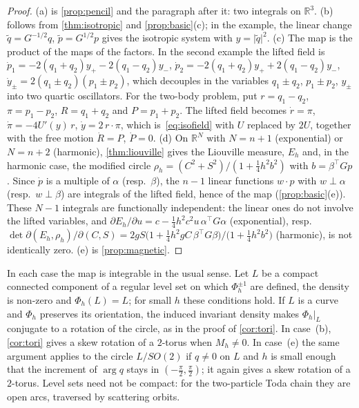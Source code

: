 \documentclass[11pt,a4paper]{article}
\theoremstyle{definition}
\theoremstyle{remark}
\newcommand{\R}{\mathbb{R}}
\newcommand{\tr}{^{\!\top}}
\begin{document}
\begin{proof}
(a) is \cref{prop:pencil} and the paragraph after it: two integrals on $\R^3$. (b) follows from
\cref{thm:isotropic} and \cref{prop:basic}(c); in the example, the linear change $\tilde q=G^{-1/2}q$,
$\tilde p=G^{1/2}p$ gives the isotropic system with $y=\lvert\tilde q\rvert^2$. (c) The map is the product of the
maps of the factors. In the second example the lifted
field is $\dot p_1=-2(q_1+q_2)y_+-2(q_1-q_2)y_-$, $\dot p_2=-2(q_1+q_2)y_++2(q_1-q_2)y_-$,
$\dot y_\pm=2(q_1\pm q_2)(p_1\pm p_2)$, which decouples in the variables $q_1\pm q_2$, $p_1\pm p_2$, $y_\pm$ into two
quartic oscillators. For the two-body problem, put $r=q_1-q_2$, $\pi=p_1-p_2$, $R=q_1+q_2$ and $P=p_1+p_2$. The
lifted field becomes $\dot r=\pi$, $\dot\pi=-4U'(y)\,r$, $\dot y=2\,r\cdot\pi$, which is~\eqref{eq:isofield} with
$U$ replaced by $2U$, together with the free motion $\dot R=P$, $\dot P=0$. (d) On $\R^N$ with $N=n+1$ (exponential) or $N=n+2$ (harmonic), \cref{thm:liouville} gives
the Liouville measure, $E_h$ and, in the harmonic case, the modified circle
$\rho_h=(C^2+S^2)/(1+\frac14h^2b^2)$ with $b=\beta\tr Gp$. Since $\dot p$ is a multiple of $\alpha$ (resp.\
$\beta$), the $n-1$ linear functions $w\cdot p$ with $w\perp\alpha$ (resp.\ $w\perp\beta$) are integrals of the
lifted field, hence of the map (\cref{prop:basic}(e)). These $N-1$ integrals are functionally independent: the
linear ones do not involve the lifted variables, and $\partial E_h/\partial u=c-\frac14h^2c^2u\,\alpha\tr G\alpha$
(exponential), resp.\ $\det\partial(E_h,\rho_h)/\partial(C,S)=2gS\big(1+\frac14h^2gC\,\beta\tr G\beta\big)/
\big(1+\frac14h^2b^2\big)$ (harmonic), is not identically zero. (e) is \cref{prop:magnetic}.
\end{proof}

In each case the map is integrable in the usual sense. Let $L$ be a compact connected component of a regular
level set on which $\Phi_h^{\pm1}$ are defined, the density is non-zero and $\Phi_h(L)=L$; for small $h$ these
conditions hold. If $L$ is a curve and $\Phi_h$ preserves its orientation, the induced invariant density makes
$\Phi_h|_L$ conjugate to a rotation of the circle, as in the proof of \cref{cor:tori}. In case~(b),
\cref{cor:tori} gives a skew rotation of a $2$-torus when $M_h\ne0$. In case~(e) the same argument applies to the
circle $L/SO(2)$ if $q\ne0$ on $L$ and $h$ is small enough that the increment of $\arg q$ stays in
$(-\frac\pi2,\frac\pi2)$; it again gives a skew rotation of a $2$-torus. Level sets need not be compact: for the
two-particle Toda chain they are open arcs, traversed by scattering orbits.
\end{document}
